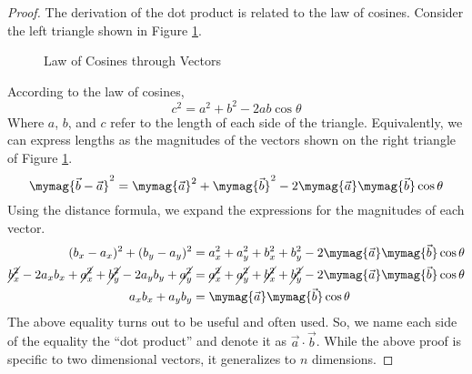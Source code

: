 \documentclass[11pt]{article}
\newtheorem{proof}{Proof}
\begin{document}
\begin{proof}
    The derivation of the dot product is related to the law of cosines. Consider the left triangle shown in Figure \ref{two_triangles}.
\begin{figure}
\centering
\begin{subfigure}
    \centering
\end{subfigure}
\begin{subfigure}
    \centering
\end{subfigure}
\caption{Law of Cosines through Vectors}
\label{two_triangles}
\end{figure}
According to the law of cosines,
\begin{equation*}
    c^2=a^2+b^2-2ab\cos{\theta}
\end{equation*}
Where $a$, $b$, and $c$ refer to the length of each side of the triangle. Equivalently, we can express lengths as the magnitudes of the vectors shown on the right triangle of Figure \ref{two_triangles}.
\begin{equation*}
    \mymag{\vec{b}-\vec{a}}^2=\mymag{\vec{a}}^2+\mymag{\vec{b}}^2-2\mymag{\vec{a}}\mymag{\vec{b}}\cos{\theta}
\end{equation*}
Using the distance formula, we expand the expressions for the magnitudes of each vector.
\begin{align*}
    (b_x-a_x)^2 + (b_y-a_y)^2 &= a_x^2 + a_y^2 + b_x^2 + b_y^2 - 2\mymag{\vec a}\mymag{\vec b}\cos{\theta}\\
    \cancel{b_x^2}-2a_xb_x+\cancel{a_x^2}+\cancel{b_y^2}-2a_yb_y+\cancel{a_y^2}	&= \cancel{a_x^2} + \cancel{a_y^2} + \cancel{b_x^2} + \cancel{b_y^2} - 2\mymag{\vec a}\mymag{\vec b}\cos{\theta}\\
    a_xb_x+a_yb_y &= \mymag{\vec a}\mymag{\vec b}\cos{\theta}
\end{align*}
The above equality turns out to be useful and often used. So, we name each side of the equality the ``dot product'' and denote it as $\vec{a} \cdot \vec{b}$. While the above proof is specific to two dimensional vectors, it generalizes to $n$ dimensions.
\end{proof}
\end{document}
